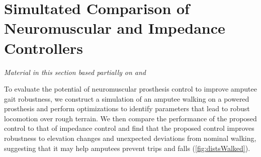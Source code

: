 \chapter{Simultated Comparison of Neuromuscular and Impedance Controllers}\label{sec:control_sim}

\graphicspath{{chapters/control_simulation/figures/}}

\emph{Material in this section based partially on
\citet{thatte2016toward}\cite{thatte2016toward} and
\citet{thatte2014towards}\cite[0.25in]{thatte2014towards}} \linebreak

To evaluate the potential of neuromuscular prosthesis control to improve amputee
gait robustness, we construct a simulation of an amputee walking on a powered
prosthesis and perform optimizations to identify parameters that lead to robust
locomotion over rough terrain. We then compare the performance of the proposed
control to that of impedance control and find that the proposed control improves
robustness to elevation changes and unexpected deviations from nominal walking,
suggesting that it may help amputees prevent trips and falls
(\cref{fig:distsWalked}).




